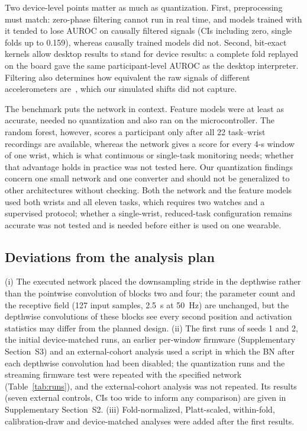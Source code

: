 \documentclass[preprint,12pt]{elsarticle}
\begin{document}
Two device-level points matter as much as quantization. First, preprocessing must match: zero-phase filtering cannot run in real time, and models trained with it tended to lose AUROC on causally filtered signals (CIs including zero, single folds up to 0.159), whereas causally trained models did not. Second, bit-exact kernels allow desktop results to stand for device results: a complete fold replayed on the board gave the same participant-level AUROC as the desktop interpreter. Filtering also determines how equivalent the raw signals of different accelerometers are~\cite{CoyleAsbil2026}, which our simulated shifts did not capture.

The benchmark puts the network in context. Feature models were at least as accurate, needed no quantization and also ran on the microcontroller. The random forest, however, scores a participant only after all 22 task--wrist recordings are available, whereas the network gives a score for every 4-s window of one wrist, which is what continuous or single-task monitoring needs; whether that advantage holds in practice was not tested here. Our quantization findings concern one small network and one converter and should not be generalized to other architectures without checking. Both the network and the feature models used both wrists and all eleven tasks, which requires two watches and a supervised protocol; whether a single-wrist, reduced-task configuration remains accurate was not tested and is needed before either is used on one wearable.

\subsection{Deviations from the analysis plan}
\label{sec:dev}
(i) The executed network placed the downsampling stride in the depthwise rather than the pointwise convolution of blocks two and four; the parameter count and the receptive field (127 input samples, 2.5~s at 50~Hz) are unchanged, but the depthwise convolutions of these blocks see every second position and activation statistics may differ from the planned design. (ii) The first runs of seeds 1 and 2, the initial device-matched runs, an earlier per-window firmware (Supplementary Section~S3) and an external-cohort analysis used a script in which the BN after each depthwise convolution had been disabled; the quantization runs and the streaming firmware test were repeated with the specified network (Table~\ref{tab:runs}), and the external-cohort analysis was not repeated. Its results (seven external controls, CIs too wide to inform any comparison) are given in Supplementary Section~S2. (iii) Fold-normalized, Platt-scaled, within-fold, calibration-draw and device-matched analyses were added after the first results.
\end{document}
